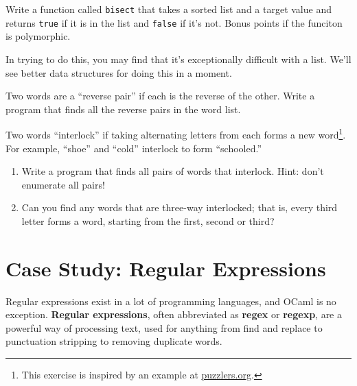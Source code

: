 \documentclass[10pt]{book}
\begin{document}
{\begin{ex}
Write a function called {\tt bisect} that takes a sorted list
and a target value and returns {\tt true} if it is in the list
and {\tt false} if it's not. Bonus points if the funciton is 
polymorphic.

In trying to do this, you may find that it's exceptionally difficult
with a list. We'll see better data structures for doing this in a 
moment.

% 
\end{ex}

\begin{ex}

Two words are a ``reverse pair'' if each is the reverse of the
other.  Write a program that finds all the reverse pairs in the
word list. 
\end{ex}

\begin{ex}

Two words ``interlock'' if taking alternating letters from each forms
a new word\footnote{This exercise is inspired by an example at
  \url{puzzlers.org}.}.  For example, ``shoe'' and ``cold''
interlock to form ``schooled.''

\begin{enumerate}

\item Write a program that finds all pairs of words that interlock.
  Hint: don't enumerate all pairs!

\item Can you find any words that are three-way interlocked; that is,
  every third letter forms a word, starting from the first, second or
  third?

\end{enumerate}
\end{ex}

\chapter{Case Study: Regular Expressions}
\label{chap:regex}

Regular expressions exist in a lot of programming languages, and OCaml is no exception. {\bf Regular expressions}, often abbreviated as {\bf regex} or {\bf regexp}, are a powerful way of processing text, used for anything from find and replace to punctuation stripping to removing duplicate words.

}
\end{document}
